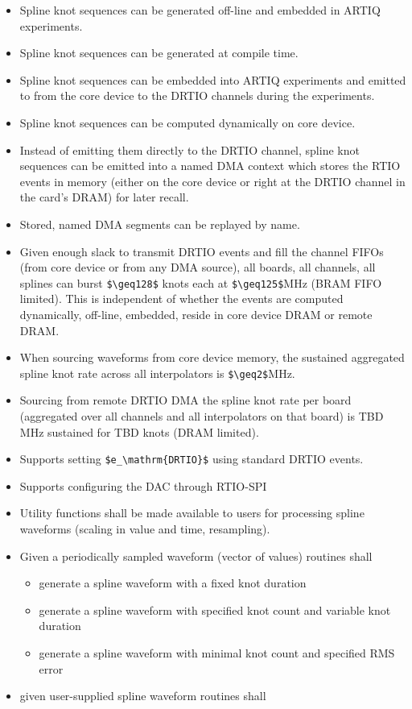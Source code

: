 \begin{itemize}
	\item
	Spline knot sequences can be generated off-line and embedded in ARTIQ
	experiments.
	\item
	Spline knot sequences can be generated at compile time.
	\item
	Spline knot sequences can be embedded into ARTIQ experiments and
	emitted to from the core device to the DRTIO channels during the
	experiments.
	\item
	Spline knot sequences can be computed dynamically on core device.
	\item
	Instead of emitting them directly to the DRTIO channel, spline knot
	sequences can be emitted into a named DMA context which stores the
	RTIO events in memory (either on the core device or right at the DRTIO
	channel in the card's DRAM) for later recall.
	\item
	Stored, named DMA segments can be replayed by name.
	\item
	Given enough slack to transmit DRTIO events and fill the channel FIFOs
	(from core device or from any DMA source), all boards, all channels,
	all splines can burst \texttt{\$\textbackslash{}geq128\$} knots each
	at \texttt{\$\textbackslash{}geq125\$}MHz (BRAM FIFO limited). This is
	independent of whether the events are computed dynamically, off-line,
	embedded, reside in core device DRAM or remote DRAM.
	\item
	When sourcing waveforms from core device memory, the sustained
	aggregated spline knot rate across all interpolators is
	\texttt{\$\textbackslash{}geq2\$}MHz.
	\item
	Sourcing from remote DRTIO DMA the spline knot rate per board
	(aggregated over all channels and all interpolators on that board) is
	TBD MHz sustained for TBD knots (DRAM limited).
	\item
	Supports setting \texttt{\$e\_\textbackslash{}mathrm\{DRTIO\}\$} using
	standard DRTIO events.
	\item
	Supports configuring the DAC through RTIO-SPI
	\item
	Utility functions shall be made available to users for processing
	spline waveforms (scaling in value and time, resampling).
	\item
	Given a periodically sampled waveform (vector of values) routines
	shall
	
	\begin{itemize}
		\item
		generate a spline waveform with a fixed knot duration
		\item
		generate a spline waveform with specified knot count and variable
		knot duration
		\item
		generate a spline waveform with minimal knot count and specified RMS
		error
	\end{itemize}
	\item
	given user-supplied spline waveform routines shall
	

\end{itemize}
